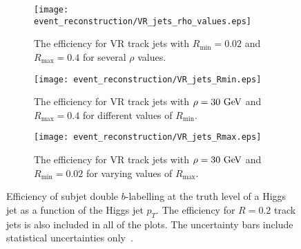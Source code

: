 \begin{figure}[htbp]
 \centering
 \begin{subfigure}[t]{0.48\textwidth}
  \centering
  \texttt{[image: event\_reconstruction/VR\_jets\_rho\_values.eps]}
  \caption[The efficiency for VR track jets with ${R_{\mathrm{min}}=0.02}$ and ${R_{\mathrm{max}} = 0.4}$ for several $\rho$ values.]{%
   The efficiency for VR track jets with ${R_{\mathrm{min}}=0.02}$ and ${R_{\mathrm{max}} = 0.4}$ for several $\rho$ values.}
  \label{fig:VR_jets_rho_values}
 \end{subfigure}%
 \quad
 \begin{subfigure}[t]{0.48\textwidth}
  \centering
  \texttt{[image: event\_reconstruction/VR\_jets\_Rmin.eps]}
  \caption[The efficiency for VR track jets with ${\rho=30~\GeV}$ and ${R_{\mathrm{max}} = 0.4}$ for different values of $R_{\mathrm{min}}$.]{%
   The efficiency for VR track jets with ${\rho=30~\GeV}$ and ${R_{\mathrm{max}} = 0.4}$ for different values of $R_{\mathrm{min}}$.}
  \label{fig:VR_jets_Rmin}
 \end{subfigure}%

 \begin{subfigure}[t]{0.48\textwidth}
  \centering
  \texttt{[image: event\_reconstruction/VR\_jets\_Rmax.eps]}
  \caption[The efficiency for VR track jets with ${\rho=30~\GeV}$ and ${R_{\mathrm{min}} = 0.02}$ for varying values of $R_{\mathrm{max}}$.]{%
   The efficiency for VR track jets with ${\rho=30~\GeV}$ and ${R_{\mathrm{min}} = 0.02}$ for varying values of $R_{\mathrm{max}}$.}
  \label{fig:VR_jets_Rmax}
 \end{subfigure}%
 \caption[Efficiency of subjet double $b$-labelling at the truth level of a Higgs jet as a function of the Higgs jet $p_{T}$.]{%
  Efficiency of subjet double $b$-labelling at the truth level of a Higgs jet as a function of the Higgs jet $p_{T}$.
  The efficiency for $R=0.2$ track jets is also included in all of the plots.
  The uncertainty bars include statistical uncertainties only~\cite{ATL-PHYS-PUB-2017-010}.}
 \label{fig:VR_jets_parameters}
\end{figure}

